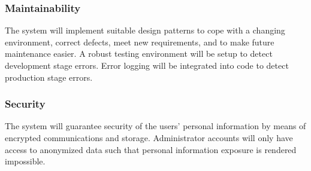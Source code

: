 \subsubsection{Maintainability}
The system will implement suitable design patterns to cope with a changing environment, correct defects, meet new requirements, and to make future maintenance easier. A robust testing environment will be setup to detect development stage errors. Error logging will be integrated into code to detect production stage errors.

\subsubsection{Security}
The system will guarantee security of the users' personal information by means of encrypted communications and storage. Administrator accounts will only have access to anonymized data such that personal information exposure is rendered impossible.